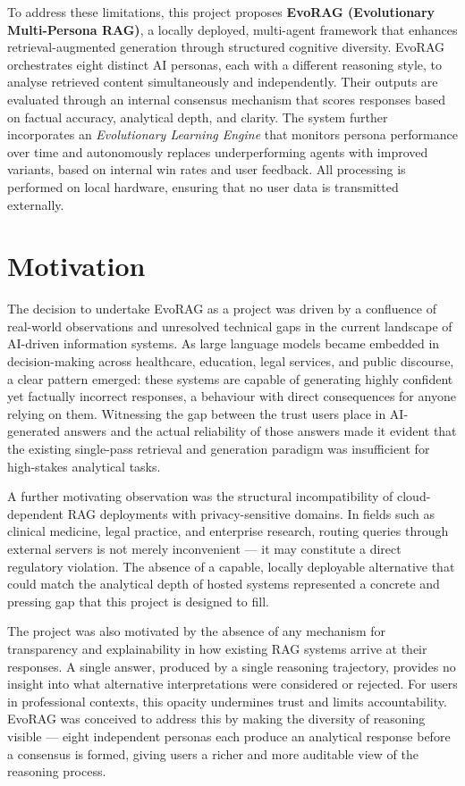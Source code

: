 To address these limitations, this project proposes \textbf{EvoRAG (Evolutionary
Multi-Persona RAG)}, a locally deployed, multi-agent framework that enhances
retrieval-augmented generation through structured cognitive
diversity.
EvoRAG orchestrates eight distinct AI personas, each with a different reasoning style,
to analyse retrieved content simultaneously and independently.
Their outputs are evaluated through an internal consensus mechanism that scores
responses based on factual accuracy, analytical depth, and clarity.
The system further incorporates an \emph{Evolutionary Learning Engine} that monitors
persona performance over time and autonomously replaces underperforming agents with
improved variants, based on internal win rates and user feedback.
All processing is performed on local hardware, ensuring that no user data is transmitted
externally.

\section{Motivation}

The decision to undertake EvoRAG as a project was driven by a confluence of
real-world observations and unresolved technical gaps in the current landscape of
AI-driven information systems.
As large language models became embedded in decision-making across healthcare, education,
legal services, and public discourse, a clear pattern emerged: these systems are capable
of generating highly confident yet factually incorrect responses, a behaviour with direct
consequences for anyone relying on them.
Witnessing the gap between the trust users place in AI-generated answers and the actual
reliability of those answers made it evident that the existing single-pass retrieval and
generation paradigm was insufficient for high-stakes analytical tasks.

A further motivating observation was the structural incompatibility of cloud-dependent
RAG deployments with privacy-sensitive domains.
In fields such as clinical medicine, legal practice, and enterprise research, routing
queries through external servers is not merely inconvenient — it may constitute a
direct regulatory violation.
The absence of a capable, locally deployable alternative that could match the analytical
depth of hosted systems represented a concrete and pressing gap that this project
is designed to fill.

The project was also motivated by the absence of any mechanism for transparency and
explainability in how existing RAG systems arrive at their responses.
A single answer, produced by a single reasoning trajectory, provides no insight into
what alternative interpretations were considered or rejected.
For users in professional contexts, this opacity undermines trust and limits
accountability.
EvoRAG was conceived to address this by making the diversity of reasoning visible —
eight independent personas each produce an analytical response before a consensus
is formed, giving users a richer and more auditable view of the reasoning process.


